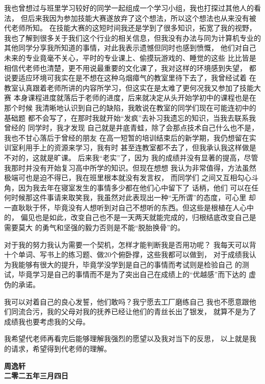 \documentclass[a4paper]{article}
\begin{document}
我也曾想过与班里学习较好的同学一起组成一个学习小组，我也打探过其他人的看法，
但后来我因为参加技能大赛遂放弃了这个想法，所以这个想法也从来没有被代老师所知。
在技能大赛的这短时间我还是学到了很多知识，拓宽了我的视野，
我也了解到很多关于我们这个行业的相关信息，但我没有办法与同为计算机专业的
其他同学分享我所知道的事情，对此我表示遗憾但同时也感到愤慨，
他们对自己未来的专业竟毫不关心，平时的专业课上、偷摸玩游戏的、睡觉的这些
比比皆是相信代老师也清楚，更不用说最重要的文化课了，我对这样的环境感到失望，
都说要适应环境可我实在是不想在这种乌烟瘴气的教室里待下去了，我曾经试着
在教室认真跟着老师所讲的内容所学习，但这实在是太难了更何况我又参加了技能大赛
本身课程进度就落后于老师的进度，后来就决定从头开始学初中的课程也是在那个时候
我清晰地认识到自己的缺陷，我敢说在教室的同学们现在可能连初中的基础题
都不会写了，在那时我就开始“发疯”去补习我遗忘的知识，当我去联系我曾经的
同学时，我才发现
自己就是井底青蛙，除了会那点技术自己什么也不是，我也不甘心落后于曾经的朋友
在高一短暂的培训结束后的新学期，我仍想留在实训室利用手上的资源来学习，我有时
甚至连教室都不去了，但我承认我这样做是不对的，这就是旷课。
后来我“老实”了，因为
我的成绩并没有显著的提高，尽管我那时并没有开始复习高中所学的知识。但现在想想
我认为非常值得，方法虽然极端可也是迫不得已，我在班里根本就没有发言权，
而同学们
之间又互相勾心斗角，因为我去年在寝室发生的事情多少都在他们心中留下了
话柄，他们
可以在任何时候那这件事请来取笑我，我虽然对此表现出一种“无所谓”的态度，可心里
却一直耿耿于怀，毕竟没有人想听到对自己不想听的东西。但这些是根植在人心中的，
偏见也是如此，改变自己也不是一天两天就能完成的，归根结底改变自己是需要莫大
的勇气和坚强的毅力否则是不能“脱胎换骨”的。

对于我的努力我认为需要一个契机，怎样才能判断我是否用功呢？
我每天可以背十个单词、写书上的练习题、做20个俯卧撑，这些我都可以做到，
对于成绩我认为我能够有很大的提升，毕竟学没学到是自己的事情而考试则是检验自己
的测试，毕竟学习是自己的事情而不是为了突出自己在成绩上的“优越感”而下达的
虚伪的承诺。

我可以对着自己的良心发誓，他们敢吗？我宁愿去工厂磨练自己
我也不愿意跟他们同流合污，我的父母对我的抚养已经让他们的青丝长出了银发，
就算不是为了成绩我也要考虑我的父母。

我希望代老师再看完后能够理解我强烈的愿望以及我对当下的反思，
以上就是我的请求，希望得到代老师的理解。

\begin{flushright}
	\textbf{周逸轩} \\
    \textbf{二零二五年三月四日}
\end{flushright}
\end{document}
